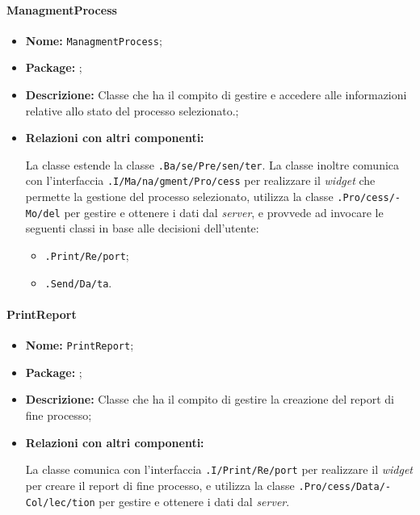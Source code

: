 \paragraph{ManagmentProcess}
\begin{flushleft}
\begin{itemize}
\item \textbf{Nome:} \texttt{ManagmentProcess};
\item \textbf{Package:} \texttt{\logicUser};
\item \textbf{Descrizione:} Classe che ha il compito di gestire e accedere alle informazioni relative allo stato del processo selezionato.;
\item \textbf{Relazioni con altri componenti:}
\begin{sloppypar}
La classe estende la classe \texttt{\viewUser{}.Ba\fshyp{}se\fshyp{}Pre\fshyp{}sen\fshyp{}ter}.
La classe inoltre comunica con l'interfaccia \texttt{\viewUser{}.I\fshyp{}Ma\fshyp{}na\fshyp{}gment\fshyp{}Pro\fshyp{}cess} per realizzare il \textit{widget} che permette la gestione del processo selezionato, utilizza la classe \texttt{\model{}.Pro\fshyp{}cess\fshyp{}Mo\fshyp{}del} per gestire e ottenere i dati dal \textit{server}, e provvede ad invocare le seguenti classi in base alle decisioni dell'utente:
\begin{itemize}
\item \texttt{\logicUser{}.Print\fshyp{}Re\fshyp{}port};
\item \texttt{\logicUser{}.Send\fshyp{}Da\fshyp{}ta}.
\end{itemize}
\end{sloppypar}
\end{itemize}
\end{flushleft}

\paragraph{PrintReport}
\begin{flushleft}
\begin{itemize}
\item \textbf{Nome:} \texttt{PrintReport};
\item \textbf{Package:} \texttt{\logicUser};
\item \textbf{Descrizione:} Classe che ha il compito di gestire la creazione del report di fine processo;
\item \textbf{Relazioni con altri componenti:}
\begin{sloppypar}
La classe comunica con l'interfaccia \texttt{\viewUser{}.I\fshyp{}Print\fshyp{}Re\fshyp{}port} per realizzare il \textit{widget} per creare il report di fine processo, e utilizza la classe \texttt{\collectionu{}.Pro\fshyp{}cess\fshyp{}Data\fshyp{}Col\fshyp{}lec\fshyp{}tion} per gestire e ottenere i dati dal \textit{server}.
\end{sloppypar}
\end{itemize}
\end{flushleft}

